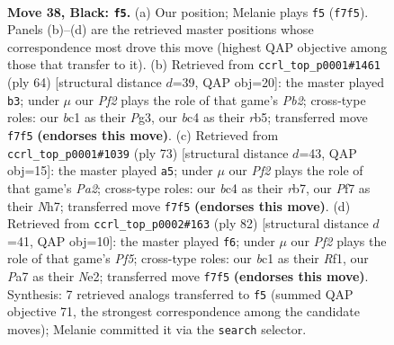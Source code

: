 \documentclass[11pt]{article}
\begin{document}
\clearpage

\begin{figure}[p]\centering
\begin{subfigure}{0.46\textwidth}\centering
\resizebox{\linewidth}{!}{%
\newchessgame
\chessboard[
  setfen={4r3/pb1p1pk1/8/6P1/2B5/8/PPK2n2/2B3R1 b - - 1 38},
  showmover=false,
  pgfstyle=straightmove, color=movearrow, markmove={f7-f5}
]}
\caption{}
\end{subfigure}\hfill
\begin{subfigure}{0.46\textwidth}\centering
\resizebox{\linewidth}{!}{%
\newchessgame
\chessboard[
  setfen={8/p6p/4k1pB/1r2pb2/2R5/6P1/PP5P/6K1 w - - 0 33},
  showmover=false,
  pgfstyle=straightmove, color=movearrow, markmove={b2-b3}
]}
\caption{}
\end{subfigure}
\\[4pt]
\begin{subfigure}{0.46\textwidth}\centering
\resizebox{\linewidth}{!}{%
\newchessgame
\chessboard[
  setfen={6k1/pR5n/4p1p1/3p4/7P/P6P/1P3PBK/2r5 b - - 2 37},
  showmover=false,
  pgfstyle=straightmove, color=movearrow, markmove={a7-a5}
]}
\caption{}
\end{subfigure}\hfill
\begin{subfigure}{0.46\textwidth}\centering
\resizebox{\linewidth}{!}{%
\newchessgame
\chessboard[
  setfen={2b3B1/7p/pk6/5Pp1/1P2K3/r7/4N2b/5R2 w - - 0 42},
  showmover=false,
  pgfstyle=straightmove, color=movearrow, markmove={f5-f6}
]}
\caption{}
\end{subfigure}
\caption{\textbf{Move 38, Black: \texttt{f5}.} (a) Our position; Melanie plays \texttt{f5} (\texttt{f7f5}). Panels (b)--(d) are the retrieved master positions whose correspondence most drove this move (highest QAP objective among those that transfer to it). (b) Retrieved from \texttt{ccrl\_top\_p0001\#1461} (ply 64) [structural distance $d$=39, QAP obj=20]: the master played \texttt{b3}; under $\mu$ our \emph{Pf2} plays the role of that game's \emph{Pb2}; cross-type roles: our \emph{b}c1 as their \emph{P}g3, our \emph{b}c4 as their \emph{r}b5; transferred move \texttt{f7f5} \textbf{(endorses this move)}. (c) Retrieved from \texttt{ccrl\_top\_p0001\#1039} (ply 73) [structural distance $d$=43, QAP obj=15]: the master played \texttt{a5}; under $\mu$ our \emph{Pf2} plays the role of that game's \emph{Pa2}; cross-type roles: our \emph{b}c4 as their \emph{r}b7, our \emph{P}f7 as their \emph{N}h7; transferred move \texttt{f7f5} \textbf{(endorses this move)}. (d) Retrieved from \texttt{ccrl\_top\_p0002\#163} (ply 82) [structural distance $d$=41, QAP obj=10]: the master played \texttt{f6}; under $\mu$ our \emph{Pf2} plays the role of that game's \emph{Pf5}; cross-type roles: our \emph{b}c1 as their \emph{R}f1, our \emph{P}a7 as their \emph{N}e2; transferred move \texttt{f7f5} \textbf{(endorses this move)}. Synthesis: 7 retrieved analogs transferred to \texttt{f5} (summed QAP objective 71, the strongest correspondence among the candidate moves); Melanie committed it via the \texttt{search} selector.}
\label{fig:thought-m75}
\end{figure}
\end{document}
